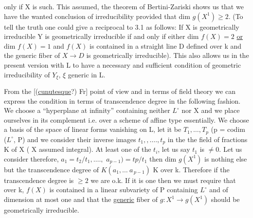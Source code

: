 
only if X is such.  This assumed, the theorem of Bertini-Zariski
shows us that we have the wanted conclusion of irreducibility
provided that dim $g(X^1) \geq 2$.  (To tell the truth one could give a
reciprocal to 3.1 as follows:  If X is geometrically irreducible Y
is geometrically irreducible if and only if either dim $f(X) = 2$ \uline{or}
dim $f(X) = 1$ and $f(X)$ is contained in a straight line D defined
over k and the generic fiber of $X \to D$ is geometrically
irreducible).  This also allows us in the present version with L
to have a necessary and sufficient condition of geometric
irreducibility of $Y_{\xi}$, $\xi$ generic in L.

From the [(\uline{cunutesque}?) Fr] point of view and in terms of
field theory we can express the condition in terms of
transcendence degree in the following fashion.  We choose a
``hyperplane at infinity'' containing neither $L^{\circ}$ nor X and we place
ourselves in its complement i.e. over a scheme of affine type
essentially.  We choose a basis of the space of linear forms
vanishing on L, let it be $T_1, \ldots, T_p$ (p = codim ($L^{\circ}$, P) and we
consider their inverse images $t_1,, \ldots., t_p$ in the the field of
fractions K of X (  X assumed integral).  At least one of the $t_i$,
let us say $t_1$ is $\neq 0$.  Let us consider therefore, $a_1 = t_2/t_1, \ldots.,$
$a_{p-1}) = tp/t_1$ then dim $g(X^1)$ is nothing else but the transcendence
degree of $K(a_1, \ldots\ a_{\,p-1})$ \hand{$\subset$} K over k.  Therefore if the
transcendence degree is $\geq 2$ we are o.k.  If it is one then we must
require that over k, $f(X)$ is contained in a linear subvariety of P
containing $L^{\circ}$ and of dimension at most one and that the \uline{generic}
fiber of $g{:}X^1 \to g(X^1)$ should be geometrically irreducible.
